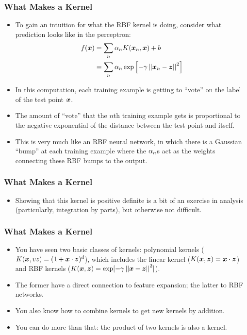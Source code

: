 \documentclass[trans]{beamer}
\begin{document}
\begin{frame}
  \frametitle{What Makes a Kernel}
\begin{itemize}
\item 
 To gain an intuition for what the RBF kernel is
doing, consider what prediction looks like in the perceptron:
%
\begin{align}
f({\boldsymbol{x}}) &= \sum_n \alpha_n K({\boldsymbol{x}}_n, {\boldsymbol{x}}) + b \\
&= \sum_n \alpha_n \exp\left[ - \gamma \left\vert\left\vert {\boldsymbol{x}}_n-{\boldsymbol{z}} \right\vert\right\vert^2 \right]
\end{align}
%
\item In this computation, each training example is getting to ``vote'' on
the label of the test point ${\boldsymbol{x}}$.
\item  The amount of ``vote'' that the
$n$th training example gets is proportional to the negative
exponential of the distance between the test point and itself. 
\item This
is very much like an RBF neural network, in which there is a Gaussian
``bump'' at each training example
where
the $\alpha_n$s act as the weights connecting these RBF bumps to the
output.
\end{itemize}
\end{frame}

\begin{frame}
  \frametitle{What Makes a Kernel}
\begin{itemize}
\item 
Showing that this kernel is positive definite is a bit of an exercise
in analysis (particularly, integration by parts), but otherwise not
difficult.
\end{itemize}
\end{frame}

\begin{frame}
  \frametitle{What Makes a Kernel}
\begin{itemize}
\item 
You have seen two basic classes of kernels: polynomial kernels
($K({\boldsymbol{x}},vz) = (1 + {\boldsymbol{x}} \cdot {\boldsymbol{z}})^d$), which includes the linear
kernel ($K({\boldsymbol{x}},{\boldsymbol{z}}) = {\boldsymbol{x}} \cdot {\boldsymbol{z}}$) and RBF kernels ($K({\boldsymbol{x}},{\boldsymbol{z}}) =
\exp[-\gamma \left\vert\left\vert {\boldsymbol{x}}-{\boldsymbol{z}} \right\vert\right\vert^2]$). 
\item  The former have a direct connection to
feature expansion; the latter to RBF networks.  
\item You also know how to
combine kernels to get new kernels by addition.  
\item You can do
more than that: the product of two kernels is also a kernel.
\end{itemize}
\end{frame}
\end{document}

